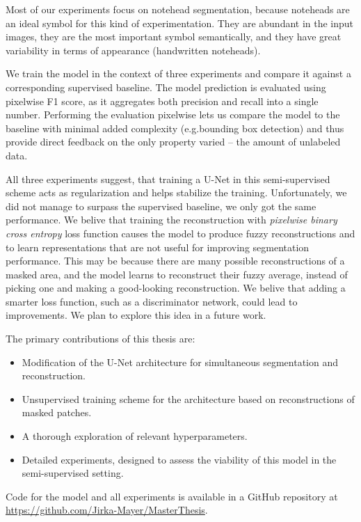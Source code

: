 Most of our experiments focus on notehead segmentation, because noteheads are an ideal symbol for this kind of experimentation. They are abundant in the input images, they are the most important symbol semantically, and they have great variability in terms of appearance (handwritten noteheads).

We train the model in the context of three experiments and compare it against a corresponding supervised baseline. The model prediction is evaluated using pixelwise F1 score, as it aggregates both precision and recall into a single number. Performing the evaluation pixelwise lets us compare the model to the baseline with minimal added complexity (e.g.\@ bounding box detection) and thus provide direct feedback on the only property varied -- the amount of unlabeled data.

All three experiments suggest, that training a U-Net in this semi-supervised scheme acts as regularization and helps stabilize the training. Unfortunately, we did not manage to surpass the supervised baseline, we only got the same performance. We belive that training the reconstruction with \emph{pixelwise binary cross entropy} loss function causes the model to produce fuzzy reconstructions and to learn representations that are not useful for improving segmentation performance. This may be because there are many possible reconstructions of a masked area, and the model learns to reconstruct their fuzzy average, instead of picking one and making a good-looking reconstruction. We belive that adding a smarter loss function, such as a discriminator network, could lead to improvements. We plan to explore this idea in a future work.

The primary contributions of this thesis are:

\begin{itemize}
    \item Modification of the U-Net architecture for simultaneous segmentation and reconstruction.
    \item Unsupervised training scheme for the architecture based on reconstructions of masked patches.
    \item A thorough exploration of relevant hyperparameters.
    \item Detailed experiments, designed to assess the viability of this model in the semi-supervised setting.
\end{itemize}

Code for the model and all experiments is available in a GitHub repository at \url{https://github.com/Jirka-Mayer/MasterThesis}.


